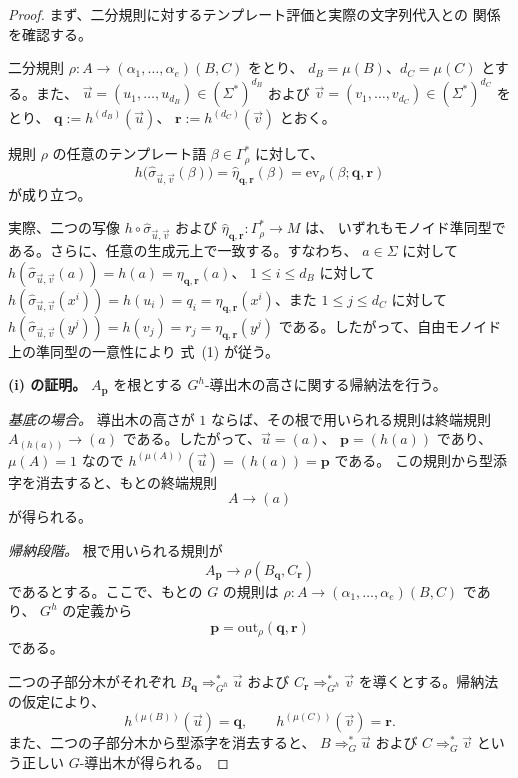 \documentclass[11pt,a4paper]{ltjsarticle}
\theoremstyle{remark}
\newcommand{\out}{\mathrm{out}}
\newcommand{\ev}{\mathrm{ev}}
\newcommand{\tuple}[1]{\vec{#1}}
\begin{document}
\begin{proof}
まず、二分規則に対するテンプレート評価と実際の文字列代入との
関係を確認する。

二分規則 \(\rho\colon A\to(\alpha_1,\ldots,\alpha_e)(B,C)\) をとり、
\(d_B=\mu(B)\)、\(d_C=\mu(C)\) とする。また、
\(\tuple u=(u_1,\ldots,u_{d_B})\in(\Sigma^*)^{d_B}\) および
\(\tuple v=(v_1,\ldots,v_{d_C})\in(\Sigma^*)^{d_C}\) をとり、
\(\mathbf q:=h^{(d_B)}(\tuple u)\)、
\(\mathbf r:=h^{(d_C)}(\tuple v)\) とおく。

規則 \(\rho\) の任意のテンプレート語
\(\beta\in\Gamma_\rho^*\) に対して、
\[
  h\bigl(
    \widehat{\sigma}_{\tuple u,\tuple v}(\beta)
  \bigr)
  =
  \widehat{\eta}_{\mathbf q,\mathbf r}(\beta)
  =
  \ev_\rho(\beta;\mathbf q,\mathbf r)
  \tag{1}
\]
が成り立つ。

実際、二つの写像
\(h\circ\widehat{\sigma}_{\tuple u,\tuple v}\) および
\(\widehat{\eta}_{\mathbf q,\mathbf r}\colon\Gamma_\rho^*\to M\) は、
いずれもモノイド準同型である。さらに、任意の生成元上で一致する。すなわち、
\(a\in\Sigma\) に対して
\(h(\widehat{\sigma}_{\tuple u,\tuple v}(a))=h(a)=\eta_{\mathbf q,\mathbf r}(a)\)、
\(1\le i\le d_B\) に対して
\(h(\widehat{\sigma}_{\tuple u,\tuple v}(x^i))=h(u_i)=q_i
=\eta_{\mathbf q,\mathbf r}(x^i)\)、また \(1\le j\le d_C\) に対して
\(h(\widehat{\sigma}_{\tuple u,\tuple v}(y^j))=h(v_j)=r_j
=\eta_{\mathbf q,\mathbf r}(y^j)\) である。したがって、自由モノイド上の準同型の一意性により
式~\textup{(1)} が従う。

\medskip
\noindent
\textbf{(i) の証明。}
\(A_{\mathbf p}\) を根とする \(G^h\)-導出木の高さに関する帰納法を行う。

\smallskip
\noindent
\emph{基底の場合。}
導出木の高さが \(1\) ならば、その根で用いられる規則は終端規則
\(A_{(h(a))}\to(a)\) である。したがって、\(\tuple u=(a)\)、
\(\mathbf p=(h(a))\) であり、\(\mu(A)=1\) なので
\(h^{(\mu(A))}(\tuple u)=(h(a))=\mathbf p\) である。
この規則から型添字を消去すると、もとの終端規則
\[
  A\to(a)
\]
が得られる。

\smallskip
\noindent
\emph{帰納段階。}
根で用いられる規則が
\[
  A_{\mathbf p}
  \to
  \rho(B_{\mathbf q},C_{\mathbf r})
  \tag{2}
\]
であるとする。ここで、もとの \(G\) の規則は
\(\rho\colon A\to(\alpha_1,\ldots,\alpha_e)(B,C)\) であり、
\(G^h\) の定義から
\[
  \mathbf p=\out_\rho(\mathbf q,\mathbf r)
  \tag{3}
\]
である。

二つの子部分木がそれぞれ
\(B_{\mathbf q}\Rightarrow_{G^h}^*\tuple u\) および
\(C_{\mathbf r}\Rightarrow_{G^h}^*\tuple v\) を導くとする。帰納法の仮定により、
\[
  h^{(\mu(B))}(\tuple u)=\mathbf q,
  \qquad
  h^{(\mu(C))}(\tuple v)=\mathbf r.
  \tag{4}
\]
また、二つの子部分木から型添字を消去すると、
\(B\Rightarrow_G^*\tuple u\) および
\(C\Rightarrow_G^*\tuple v\) という正しい \(G\)-導出木が得られる。


\end{proof}
\end{document}
